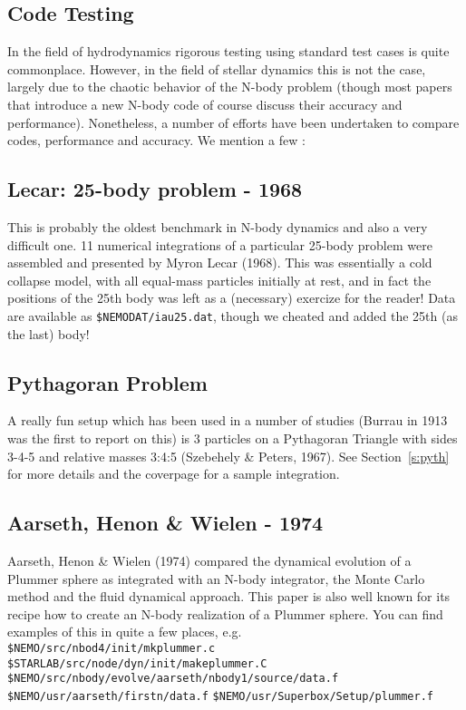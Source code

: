 \begin{itemize}
\begin{itemize}
\chapter                {Code Testing}

In the field of hydrodynamics rigorous testing using standard
test cases is quite commonplace. However, 
in the field of stellar dynamics this is not the case, largely due to
the chaotic behavior of the N-body problem 
(though
most papers that introduce a new N-body code of course discuss
their accuracy and performance).
Nonetheless, a
number of efforts have been undertaken to compare codes, performance and
accuracy. We mention a few :


\section{Lecar: 25-body problem - 1968}

This is probably the oldest benchmark in N-body dynamics and also a
very difficult one.
11 numerical integrations of a particular
25-body problem were assembled and presented
by Myron Lecar (1968).
This was essentially a cold collapse model, with all equal-mass 
particles initially at rest, and
in fact the positions of the 25th body was left as a (necessary)
exercize for the reader!
Data are available as {\tt \$NEMODAT/iau25.dat}, though we 
cheated and added the 25th (as the last) body!

\section{Pythagoran Problem}

A really fun setup which has been used in a number of studies
(Burrau in 1913 was the first to report on this)
is 3 particles on a Pythagoran Triangle with sides 3-4-5 
and relative masses 3:4:5 (Szebehely \& Peters, 1967).
See Section~\ref{s:pyth} for more details and the
coverpage for a sample integration.


\section{Aarseth, Henon \& Wielen - 1974}

Aarseth, Henon \& Wielen (1974) compared the dynamical evolution of a 
Plummer sphere as integrated with an N-body integrator,
the Monte Carlo method and the fluid dynamical approach.
This paper is also well known for its recipe how to create
an N-body realization of a Plummer sphere. You can find examples
of this in quite a few places, e.g.\\
{\tt \$NEMO/src/nbod4/init/mkplummer.c}\\
{\tt \$STARLAB/src/node/dyn/init/makeplummer.C}\\
{\tt \$NEMO/src/nbody/evolve/aarseth/nbody1/source/data.f}\\
{\tt \$NEMO/usr/aarseth/firstn/data.f}
{\tt \$NEMO/usr/Superbox/Setup/plummer.f}


\end{itemize}
\end{itemize}
